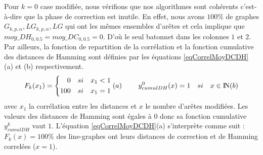 Pour $k=0$ case modifi\'ee, nous v\'erifions que nos algorithmes sont coh\'erents c'est-\`a-dire que la phase de correction est inutile. En effet, nous avons $100\%$ de graphes $G_{k,p,\alpha}, LG_{k,p,\alpha}, LG$ qui ont les m\^emes ensembles d'ar\^etes et cela implique que $moy\_DH_{0,0.5} = moy\_DC_{0,0.5} = 0$. D'o\`u le seul batonnet dans les colonnes $1$ et $2$. Par ailleurs, la fonction de repartition de la corr\'elation et la fonction cumulative des distances de Hamming sont d\'efinies par les \'equations \ref{eqCorrelMoyDCDH} (a) et (b)  respectivement.
\begin{equation}
\label{eqCorrelMoyDCDH}
F_k(x_1) = \left\{
	\begin{aligned}
	0 \hspace{1 em} si \hspace{1 em} x_1 < 1 \\
	100  \hspace{1 em}  si  \hspace{1 em}  x_1 = 1
	\end{aligned}
	\right.(a)
	\\~~~~~~~
	y_{cumulDH}^{0}(x) = 1  \hspace{1 em}  si  \hspace{1 em}   x \in \mbox{I\hspace{-.15em}N} (b)
\end{equation}
avec $x_1$ la corr\'elation entre les distances et $x$ le nombre d'ar\^etes modifi\'ees.
Les valeurs des distances de Hamming sont \'egales \`a $0$ donc sa fonction cumulative $y_{cumulDH}^{k}$ vaut $1$. 
L'\'equation  \ref{eqCorrelMoyDCDH}(a) s'interpr\`ete comme suit : $F_k(x) = 100\%$ des line-graphes ont leurs distances de correction et de Hamming correl\'ees ($x = 1$).
\newline

